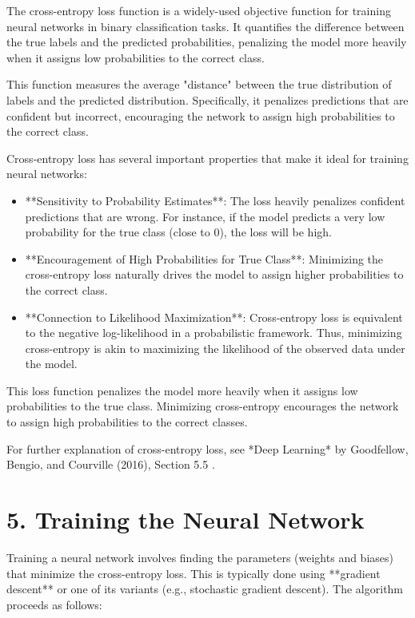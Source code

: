 \documentclass{article}
\begin{document}
The cross-entropy loss function is a widely-used objective function for training neural networks in binary classification tasks. It quantifies the difference between the true labels and the predicted probabilities, penalizing the model more heavily when it assigns low probabilities to the correct class.

This function measures the average "distance" between the true distribution of labels and the predicted distribution. Specifically, it penalizes predictions that are confident but incorrect, encouraging the network to assign high probabilities to the correct class.


Cross-entropy loss has several important properties that make it ideal for training neural networks:
\begin{itemize}
    \item **Sensitivity to Probability Estimates**: The loss heavily penalizes confident predictions that are wrong. For instance, if the model predicts a very low probability for the true class (close to 0), the loss will be high.
    \item **Encouragement of High Probabilities for True Class**: Minimizing the cross-entropy loss naturally drives the model to assign higher probabilities to the correct class.
    \item **Connection to Likelihood Maximization**: Cross-entropy loss is equivalent to the negative log-likelihood in a probabilistic framework. Thus, minimizing cross-entropy is akin to maximizing the likelihood of the observed data under the model.
\end{itemize}This loss function penalizes the model more heavily when it assigns low probabilities to the true class. Minimizing cross-entropy encourages the network to assign high probabilities to the correct classes.

For further explanation of cross-entropy loss, see *Deep Learning* by Goodfellow, Bengio, and Courville (2016), Section 5.5 \cite{goodfellow2016deep}.

\section*{5. Training the Neural Network}

Training a neural network involves finding the parameters (weights and biases) that minimize the cross-entropy loss. This is typically done using **gradient descent** or one of its variants (e.g., stochastic gradient descent). The algorithm proceeds as follows:
\end{document}
